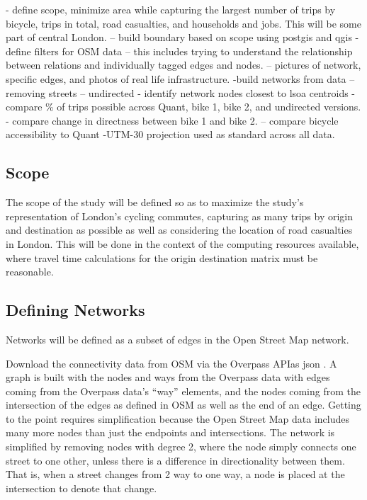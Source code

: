 
- define scope, minimize area while capturing the largest number of trips by bicycle, trips in total, road casualties, and households and jobs. This will be some part of central London. 
-- build boundary based on scope using postgis and qgis
- define filters for OSM data
-- this includes trying to understand the relationship between relations and individually tagged edges and nodes. 
-- pictures of network, specific edges, and photos of real life infrastructure. 
-build networks from data
-- removing streets
-- undirected
- identify network nodes closest to lsoa centroids
-compare \% of trips possible across Quant, bike 1, bike 2, and undirected versions. 
- compare change in directness between bike 1 and bike 2.  
-- compare bicycle accessibility to Quant
-UTM-30 projection used as standard across all data. 


\subsection{Scope}


The scope of the study will be defined so as to maximize the study's representation of London's cycling commutes, capturing as many trips by origin and destination as possible as well as considering the location of road casualties in London. This will be done in the context of the computing resources available, where travel time calculations for the origin destination matrix must be reasonable. 

\subsection{Defining Networks}

Networks will be defined as a subset of edges in the Open Street Map network. 

Download the connectivity data from OSM via the Overpass APIas json . A graph is built with the nodes and ways from the Overpass data with edges coming from the Overpass data's ``way'' elements, and the nodes coming from the intersection of the edges as defined in OSM as well as the end of an edge. Getting to the point requires simplification because the Open Street Map data includes many more nodes than just the endpoints and intersections. The network is simplified by removing nodes with degree 2, where the node simply connects one street to one other, unless there is a difference in directionality between them. That is, when a street changes from 2 way to one way, a node is placed at the intersection to denote that change. 

